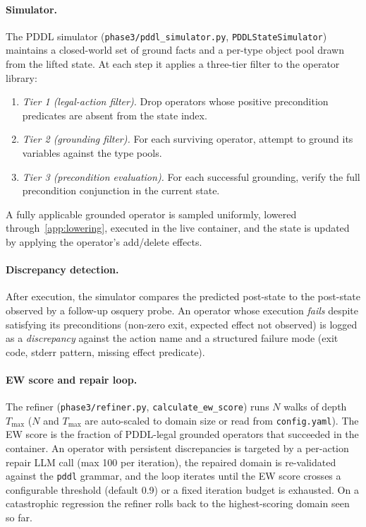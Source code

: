 \paragraph{Simulator.}
The PDDL simulator (\texttt{phase3/pddl\_simulator.py}, \texttt{PDDLStateSimulator}) maintains a closed-world set of ground facts and a per-type object pool drawn from the lifted state. At each step it applies a three-tier filter to the operator library:

\begin{enumerate}
  \item \emph{Tier 1 (legal-action filter).} Drop operators whose positive precondition predicates are absent from the state index.
  \item \emph{Tier 2 (grounding filter).} For each surviving operator, attempt to ground its variables against the type pools.
  \item \emph{Tier 3 (precondition evaluation).} For each successful grounding, verify the full precondition conjunction in the current state.
\end{enumerate}

A fully applicable grounded operator is sampled uniformly, lowered through~\ref{app:lowering}, executed in the live container, and the state is updated by applying the operator's add/delete effects.

\paragraph{Discrepancy detection.}
After execution, the simulator compares the predicted post-state to the post-state observed by a follow-up osquery probe. An operator whose execution \emph{fails} despite satisfying its preconditions (non-zero exit, expected effect not observed) is logged as a \emph{discrepancy} against the action name and a structured failure mode (exit code, stderr pattern, missing effect predicate).

\paragraph{EW score and repair loop.}
The refiner (\texttt{phase3/refiner.py}, \texttt{calculate\_ew\_score}) runs $N$ walks of depth $T_{\max}$ ($N$ and $T_{\max}$ are auto-scaled to domain size or read from \texttt{config.yaml}). The EW score is the fraction of PDDL-legal grounded operators that succeeded in the container. An operator with persistent discrepancies is targeted by a per-action repair LLM call (max 100 per iteration), the repaired domain is re-validated against the \texttt{pddl} grammar, and the loop iterates until the EW score crosses a configurable threshold (default 0.9) or a fixed iteration budget is exhausted. On a catastrophic regression the refiner rolls back to the highest-scoring domain seen so far.

